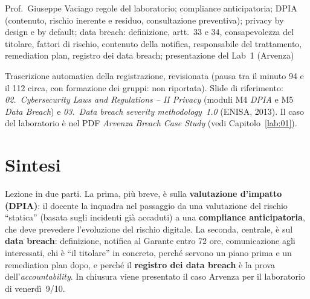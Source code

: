   {Prof.~Giuseppe Vaciago}
  {regole del laboratorio; compliance anticipatoria; DPIA (contenuto, rischio inerente e residuo,
   consultazione preventiva); privacy by design e by default; data breach: definizione, artt.~33 e 34,
   consapevolezza del titolare, fattori di rischio, contenuto della notifica, responsabile del trattamento,
   remediation plan, registro dei data breach; presentazione del Lab~1 (Arvenza)}
\label{lez:2026-10-05}

\begin{nota}[Fonte]
Trascrizione automatica della registrazione, revisionata (pausa tra il minuto 94 e il 112 circa, con
formazione dei gruppi: non riportata). Slide di riferimento: \emph{02.~Cybersecurity Laws and
Regulations -- II Privacy} (moduli M4 \emph{DPIA} e M5 \emph{Data Breach}) e
\emph{03.~Data breach severity methodology~1.0} (ENISA, 2013). Il caso del laboratorio è nel PDF
\emph{Arvenza Breach Case Study} (vedi Capitolo~\ref{lab:01}).
\end{nota}

\section{Sintesi}
Lezione in due parti. La prima, più breve, è sulla \textbf{valutazione d'impatto (DPIA)}: il
docente la inquadra nel passaggio da una valutazione del rischio ``statica'' (basata sugli incidenti
già accaduti) a una \textbf{compliance anticipatoria}, che deve prevedere l'evoluzione del rischio
digitale. La seconda, centrale, è sul \textbf{data breach}: definizione, notifica al Garante entro 72
ore, comunicazione agli interessati, chi è ``il titolare'' in concreto, perché servono un piano prima
e un remediation plan dopo, e perché il \textbf{registro dei data breach} è la prova
dell'\emph{accountability}. In chiusura viene presentato il caso Arvenza per il laboratorio di
venerdì~9/10.

